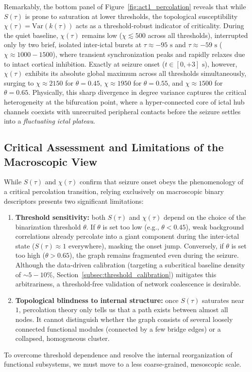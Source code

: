 Remarkably, the bottom panel of Figure~\ref{fig:act1_percolation} reveals that while $S(\tau)$ is prone to saturation at lower thresholds, the topological susceptibility $\chi(\tau) = \text{Var}(k(\tau))$ acts as a threshold-robust indicator of criticality. During the quiet baseline, $\chi(\tau)$ remains low ($\chi \lesssim 500$ across all thresholds), interrupted only by two brief, isolated inter-ictal bursts at $\tau \approx -95\text{ s}$ and $\tau \approx -59\text{ s}$ ($\chi \approx 1000-1500$), where transient synchronization peaks and rapidly relaxes due to intact cortical inhibition. Exactly at seizure onset ($t \in [0, +3]\text{ s}$), however, $\chi(\tau)$ exhibits its absolute global maximum across all thresholds simultaneously, surging to $\chi \approx 2150$ for $\theta = 0.45$, $\chi \approx 1950$ for $\theta = 0.55$, and $\chi \approx 1500$ for $\theta = 0.65$. Physically, this sharp divergence in degree variance captures the critical heterogeneity at the bifurcation point, where a hyper-connected core of ictal hub channels coexists with unrecruited peripheral contacts before the seizure settles into a \textit{fluctuating ictal plateau}.

\subsection{Critical Assessment and Limitations of the Macroscopic View}
While $S(\tau)$ and $\chi(\tau)$ confirm that seizure onset obeys the phenomenology of a critical percolation transition, relying exclusively on macroscopic binary descriptors presents two significant limitations:
\begin{enumerate}
    \item \textbf{Threshold sensitivity:} both $S(\tau)$ and $\chi(\tau)$ depend on the choice of the binarization threshold $\theta$. If $\theta$ is set too low (e.g., $\theta < 0.45$), weak background correlations already percolate into a giant component during the inter-ictal state ($S(\tau) \approx 1$ everywhere), masking the onset jump. Conversely, if $\theta$ is set too high ($\theta > 0.65$), the graph remains fragmented even during the seizure. Although the data-driven calibration (targeting a subcritical baseline density of $\sim 5-10\%$, Section~\ref{subsec:threshold_calibration}) mitigates this arbitrariness, a threshold-free validation of network coalescence is desirable.
    \item \textbf{Topological blindness to internal structure:} once $S(\tau)$ saturates near $1$, percolation theory only tells us that a path exists between almost all nodes. It cannot distinguish whether the graph consists of several loosely connected functional modules (connected by a few bridge edges) or a collapsed, homogeneous cluster.
\end{enumerate}
To overcome threshold dependence and resolve the internal reorganization of functional subsystems, we must move to a less coarse-grained, mesoscopic scale.

